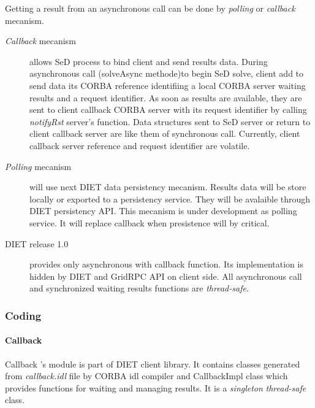   Getting a result from an asynchronous call can be done by \emph{polling} or
  \emph{callback} mecanism.

  \begin{description}
  \item[\emph{Callback} mecanism] allows SeD process to bind client and send results data.
  During asynchronous call (solveAsync methode)to begin SeD solve, client
  add to send data its CORBA reference identifiing a local CORBA server
  waiting results and a request identifier.
  As soon as results are available, they are sent to client callback CORBA server
  with its request identifier by calling \emph{notifyRst} server's function.
  Data structures sent to SeD server or return to client callback server are like
  them of synchronous call. Currently, client callback server reference and request
  identifier are volatile.
  \item[\emph{Polling} mecanism] will use next DIET data persistency mecanism.
  Results data will be store locally or exported to a persistency service.
  They will be avalaible through DIET persistency API. This mecanism is under
  development as polling service. It will replace callback when presistence will
  by critical.
  \item[DIET release 1.0] provides only asynchronous with callback function. Its
  implementation is hidden by DIET and GridRPC API on client side. All asynchronous call
  and synchronized waiting results functions are \emph{thread-safe}.
  \end{description}

  \subsubsection{Coding}
  \paragraph{Callback}
  Callback 's module is part of DIET client library. It contains classes generated
  from \emph{callback.idl} file by CORBA idl compiler and CallbackImpl class
  which provides functions for waiting and managing results. It is a \emph{singleton}
  \emph{thread-safe} class.

